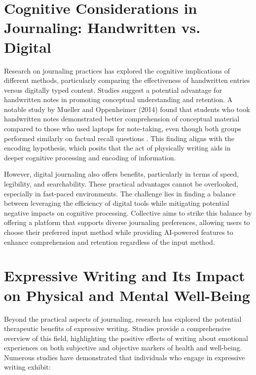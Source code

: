 \section{Cognitive Considerations in Journaling: Handwritten vs. Digital}\label{sec:cognitive}

Research on journaling practices has explored the cognitive implications of different methods, particularly comparing the effectiveness of handwritten entries versus digitally typed content. Studies suggest a potential advantage for handwritten notes in promoting conceptual understanding and retention. A notable study by Mueller and Oppenheimer (2014) found that students who took handwritten notes demonstrated better comprehension of conceptual material compared to those who used laptops for note-taking, even though both groups performed similarly on factual recall questions \cite{mueller2014pen}. This finding aligns with the encoding hypothesis, which posits that the act of physically writing aids in deeper cognitive processing and encoding of information.

However, digital journaling also offers benefits, particularly in terms of speed, legibility, and searchability. These practical advantages cannot be overlooked, especially in fast-paced environments. The challenge lies in finding a balance between leveraging the efficiency of digital tools while mitigating potential negative impacts on cognitive processing. Collective aims to strike this balance by offering a platform that supports diverse journaling preferences, allowing users to choose their preferred input method while providing AI-powered features to enhance comprehension and retention regardless of the input method.

\section{Expressive Writing and Its Impact on Physical and Mental Well-Being}\label{sec:expressive}

Beyond the practical aspects of journaling, research has explored the potential therapeutic benefits of expressive writing. Studies provide a comprehensive overview of this field, highlighting the positive effects of writing about emotional experiences on both subjective and objective markers of health and well-being. Numerous studies have demonstrated that individuals who engage in expressive writing exhibit:

